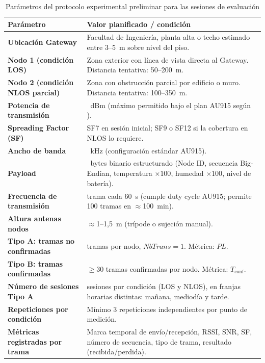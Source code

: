 \documentclass[12pt,oneside,openany,spanish,oldfontcommands]{memoir}
\renewcommand{\arraystretch}{1.15}
\begin{document}
\begin{table}[H]
\centering
\caption{Parámetros del protocolo experimental preliminar para las sesiones de evaluación}
\label{tab:protocolo}
\small
\setlength{\tabcolsep}{4pt}
\renewcommand{\arraystretch}{1.2}
\begin{tabularx}{\textwidth}{
  >{\raggedright\arraybackslash}p{4.8cm}
  >{\raggedright\arraybackslash}X
}
\toprule
\textbf{Parámetro} & \textbf{Valor planificado / condición}\\
\midrule
\textbf{Ubicación Gateway} &
Facultad de Ingeniería, planta alta o techo estimado entre 3--5~m sobre nivel del piso.\\
\midrule
\textbf{Nodo 1 (condición LOS)} &
Zona exterior con línea de vista directa al Gateway. Distancia tentativa: 50--200~m.\\
\midrule
\textbf{Nodo 2 (condición NLOS parcial)} &
Zona con obstrucción parcial por edificio o muro. Distancia tentativa: 100--350~m.\\
\midrule
\textbf{Potencia de transmisión} &
14~dBm (máximo permitido bajo el plan AU915 según \parencite{subtel2017}).\\
\midrule
\textbf{Spreading Factor (SF)} &
SF7 en sesión inicial; SF9 o SF12 si la cobertura en NLOS lo requiere.\\
\midrule
\textbf{Ancho de banda} &
125~kHz (configuración estándar AU915).\\
\midrule
\textbf{Payload} &
10~bytes binario estructurado (Node ID, secuencia Big-Endian, temperatura $\times 100$, humedad $\times 100$, nivel de batería).\\
\midrule
\textbf{Frecuencia de transmisión} &
1 trama cada 60~s (cumple duty cycle AU915; permite 100 tramas en $\approx$100~min).\\
\midrule
\textbf{Altura antenas nodos} &
$\approx$1--1,5~m (trípode o sujeción manual).\\
\midrule
\textbf{Tipo A: tramas no confirmadas} &
100 tramas por nodo, $NbTrans = 1$. Métrica: $PL$.\\
\midrule
\textbf{Tipo B: tramas confirmadas} &
$\geq$30 tramas confirmadas por nodo. Métrica: $T_{\mathrm{conf}}$.\\
\midrule
\textbf{Número de sesiones Tipo A} &
3 sesiones por condición (LOS y NLOS), en franjas horarias distintas: mañana, mediodía y tarde.\\
\midrule
\textbf{Repeticiones por condición} &
Mínimo 3 repeticiones independientes por punto de medición.\\
\midrule
\textbf{Métricas registradas por trama} &
Marca temporal de envío/recepción, RSSI, SNR, SF, número de secuencia, tipo de trama, resultado (recibida/perdida).\\
\bottomrule
\end{tabularx}
\end{table}
\end{document}
